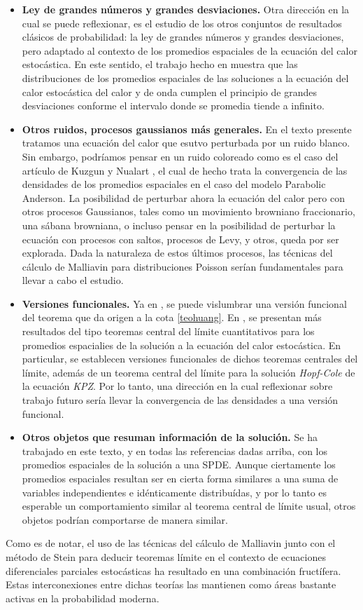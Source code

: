 \documentclass[letterpaper,twoside,12pt]{book}
\newcommand{\1}{\mathds{1}}
\theoremstyle{definition}
\theoremstyle{definition}
\theoremstyle{remark}
\theoremstyle{definition}
\theoremstyle{definition}
\theoremstyle{definition}
\theoremstyle{definition}
\theoremstyle{definition}
\begin{document}
\begin{itemize}
   \item \textbf{Ley de grandes números y grandes desviaciones.} Otra dirección en la cual se puede reflexionar, es el estudio de los otros conjuntos de resultados clásicos de probabilidad: la ley de grandes números y grandes desviaciones, pero adaptado al contexto de los promedios espaciales de la ecuación del calor estocástica. En este sentido, el trabajo hecho en \cite{ebina2024largedeviationsspatialaverage} muestra que las distribuciones de los promedios espaciales de las soluciones a la ecuación del calor estocástica del calor y de onda cumplen el principio de grandes desviaciones conforme el intervalo donde se promedia tiende a infinito.
   \item \textbf{Otros ruidos, procesos gaussianos más generales.} En el texto presente tratamos una ecuación del calor que esutvo perturbada por un ruido blanco. Sin embargo, podríamos pensar en un ruido coloreado como es el caso del artículo de Kuzgun y Nualart \cite{doi:10.1080/17442508.2023.2238954}, el cual de hecho trata la convergencia de las densidades de los promedios espaciales en el caso del modelo Parabolic Anderson. La posibilidad de perturbar ahora la ecuación del calor pero con otros procesos Gaussianos, tales como un movimiento browniano fraccionario, una sábana browniana, o incluso pensar en la posibilidad de perturbar la ecuación con procesos con saltos, procesos de Levy, y otros, queda por ser explorada. Dada la naturaleza de estos últimos procesos, las técnicas del cálculo de Malliavin para distribuciones Poisson serían fundamentales para llevar a cabo el estudio.
   \item \textbf{Versiones funcionales.} Ya en \cite{HUANG20207170}, se puede vislumbrar una versión funcional del teorema que da origen a la cota \eqref{teohuang}. En \cite{Chen2023}, se presentan más resultados del tipo teoremas central del límite cuantitativos para los promedios espacialies de la solución a la ecuación del calor estocástica. En particular, se establecen versiones funcionales de dichos teoremas centrales del límite, además de un teorema central del límite para la solución \textit{Hopf-Cole} de la ecuación \textit{KPZ}. Por lo tanto, una dirección en la cual reflexionar sobre trabajo futuro sería llevar la convergencia de las densidades a una versión funcional.
   \item \textbf{Otros objetos que resuman información de la solución.}
   Se ha trabajado en este texto, y en todas las referencias dadas arriba, con los promedios espaciales de la solución a una SPDE. Aunque ciertamente los promedios espaciales resultan ser en cierta forma similares a una suma de variables independientes e idénticamente distribuídas, y por lo tanto es esperable un comportamiento similar al teorema central de límite usual, otros objetos podrían comportarse de manera similar. 
\end{itemize}
Como es de notar, el uso de las técnicas del cálculo de Malliavin junto con el método de Stein para deducir teoremas límite en el contexto de ecuaciones diferenciales parciales estocásticas ha resultado en una combinación fructífera. Estas interconexiones entre dichas teorías las mantienen como áreas bastante activas en la probabilidad moderna.
\appendix
\end{document}
